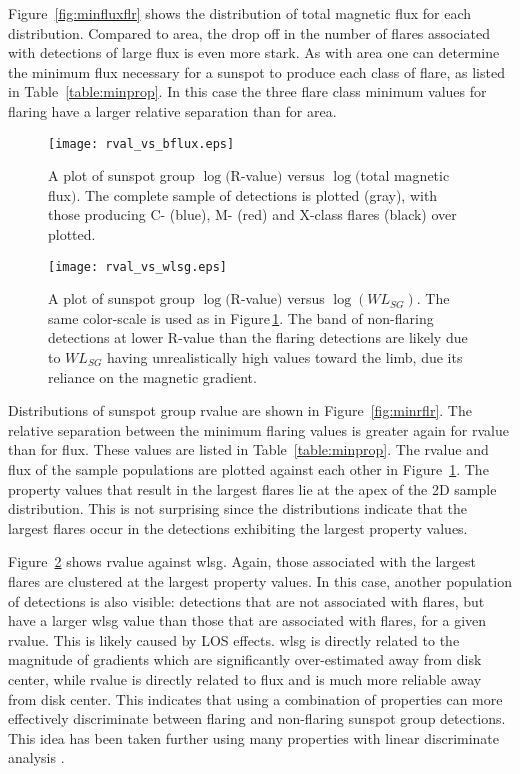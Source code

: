 Figure~\ref{fig:minfluxflr} shows the distribution of total magnetic flux for each distribution. Compared to area, the drop off in the number of flares associated with detections of large flux is even more stark. As with area one can determine the minimum flux necessary for a sunspot to produce each class of flare, as listed in Table~\ref{table:minprop}. In this case the three flare class minimum values for flaring  have a larger relative separation than for area. 

\begin{figure}[!t]
\centerline{\texttt{[image: rval\_vs\_bflux.eps]}}
\caption[AR R-value versus flux.]{A plot of sunspot group $\log($R-value$)$ versus $\log($total magnetic flux$)$. The complete sample of detections is plotted (gray), with those producing C- (blue), M- (red) and X-class flares (black) over plotted.}
\label{fig:flxvsrval}
\end{figure}

\begin{figure}[!t]
\centerline{\texttt{[image: rval\_vs\_wlsg.eps]}}
\caption[AR R-value versus $WL_{SG}$.]{A plot of sunspot group $\log($R-value$)$ versus $\log(WL_{SG})$. The same color-scale is used as in Figure\,\ref{fig:flxvsrval}. The band of non-flaring detections at lower R-value than the flaring detections are likely due to $WL_{SG}$ having unrealistically high values toward the limb, due its reliance on the magnetic gradient.}
\label{fig:rvswlsg}
\end{figure}

Distributions of sunspot group \gls{rvalue} are shown in Figure~\ref{fig:minrflr}. The relative separation between the minimum flaring values is greater again for \gls{rvalue} than for flux. These values are listed in Table~\ref{table:minprop}. The \gls{rvalue} and flux of the sample populations are plotted against each other in Figure~\ref{fig:flxvsrval}. The property values that result in the largest flares lie at the apex of the 2D sample distribution. This is not surprising since the distributions indicate that the largest flares occur in the detections exhibiting the largest property values.

Figure~\ref{fig:rvswlsg} shows \gls{rvalue} against \gls{wlsg}. Again, those associated with the largest flares are clustered at the largest property values. In this case, another population of detections is also visible: detections that are not associated with flares, but have a larger \gls{wlsg} value than those that are associated with flares, for a given \gls{rvalue}. This is likely caused by \gls{LOS} effects. \gls{wlsg} is directly related to the magnitude of gradients which are significantly over-estimated away from disk center, while \gls{rvalue} is directly related to flux and is much more reliable away from disk center. This indicates that using a combination of properties can more effectively discriminate between flaring and non-flaring sunspot group detections. This idea has been taken further using many properties with linear discriminate analysis \citep{Leka:2003a,Leka:2003b}. 


